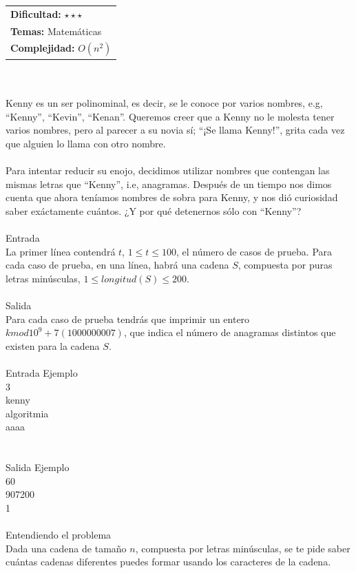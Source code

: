 \documentclass[12pt]{article}
\begin{document}
\hfill
\begin{tabular}{@{}l@{}}
\textbf{Dificultad:} $\star \star \star$ \\
\textbf{Temas:} Matemáticas \\
\textbf{Complejidad:} $O(n^2)$
\end{tabular}\\
\\
Kenny es un ser polinominal, es decir, se le conoce por varios nombres, e.g, “Kenny”, “Kevin”, “Kenan”. Queremos creer que a Kenny no le molesta tener varios nombres, pero al parecer a su novia sí; “¡Se llama Kenny!”, grita cada vez que alguien lo llama con otro nombre. \\ \\Para intentar reducir su enojo, decidimos utilizar nombres que contengan las mismas letras que “Kenny”, i.e, anagramas. Después de un tiempo nos dimos cuenta que ahora
teníamos nombres de sobra para Kenny, y nos dió curiosidad saber exáctamente cuántos. ¿Y por qué detenernos sólo con “Kenny”?
\\
\\
\textrm{\large Entrada}
\\
La primer línea contendrá $t$, $1 ≤ t ≤ 100$, el número de casos de prueba. Para cada caso de prueba, en una línea, habrá una cadena $S$, compuesta por puras letras minúsculas, $1 ≤ longitud(S) ≤ 200$.
\\
\\
\textrm{\large Salida}
\\
Para cada caso de prueba tendrás que imprimir un entero $k mod 10^9 + 7 (1000000007)$, que indica el número de anagramas distintos que existen para la cadena $S$.
\\
\\
\textrm{\large Entrada Ejemplo}
\\
3\\
kenny\\
algoritmia\\
aaaa\\
\\
\\
\textrm{\large Salida Ejemplo}
\\
60\\
907200\\
1\\
\\
\textrm{\large Entendiendo el problema}\\
Dada una cadena de tamaño $n$, compuesta por letras minúsculas, se te pide saber cuántas cadenas diferentes puedes formar usando los caracteres de la cadena.\\
\end{document}
